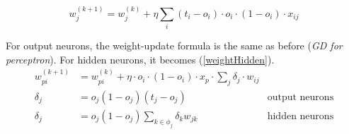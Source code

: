 \begin{example}
\begin{equation}
w_j^{(k+1)} = w_j^{(k)} + \eta\sum_i (t_i - o_i) \cdot o_i \cdot (1 - o_i) \cdot x_{ij}
\end{equation}
\end{example}
For output neurons, the weight-update formula is the same as before (\textit{GD for perceptron}). For hidden neurons, it becomes (\ref{weightHidden}).
\begin{align}
w_{pi}^{(k+1)} & = w_{pi}^{(k)} + \eta \cdot o_i \cdot (1 - o_i) \cdot x_p \cdot \sum_j \delta_j \cdot w_{ij}\label{weightHidden}
\\
\delta_j & = o_j(1-o_j)(t_j-o_j) & \text{output neurons}
\\
\delta_j & = o_j(1-o_j)\sum_{k \in \phi_j}\delta_k w_{jk} & \text{hidden neurons}
\end{align}
\newpage
